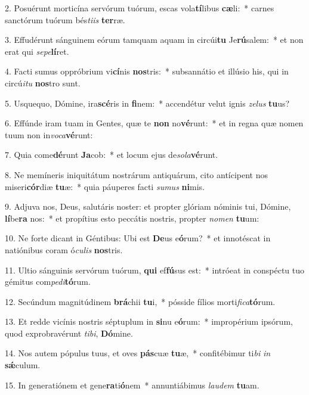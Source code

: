 2. Posuérunt morticína servórum tuórum, escas vola\textbf{tí}libus \textbf{cæ}li:~*  carnes sanctórum tuórum bés\textit{ti}\textit{is} \textbf{ter}ræ.\

3. Effudérunt sánguinem eórum tamquam aquam in circúi\textbf{tu} Je\textbf{rú}salem:~*  et non erat qui \textit{se}\textit{pe}\textbf{lí}ret.\

4. Facti sumus oppróbrium vi\textbf{cí}nis \textbf{nos}tris:~*  subsannátio et illúsio his, qui in circú\textit{i}\textit{tu} \textbf{nos}tro sunt.\

5. Usquequo, Dómine, ira\textbf{scé}ris in \textbf{fi}nem:~*  accendétur velut ignis \textit{ze}\textit{lus} \textbf{tu}us?\

6. Effúnde iram tuam in Gentes, quæ te \textbf{non} no\textbf{vé}runt:~*  et in regna quæ nomen tuum non in\textit{vo}\textit{ca}\textbf{vé}runt:\

7. Quia come\textbf{dé}runt \textbf{Ja}cob:~*  et locum ejus de\textit{so}\textit{la}\textbf{vé}runt.\

8. Ne memíneris iniquitátum nostrárum antiquárum, cito antícipent nos miseri\textbf{cór}diæ \textbf{tu}æ:~*  quia páuperes facti \textit{su}\textit{mus} \textbf{ni}mis.\

9. Adjuva nos, Deus, salutáris noster: et propter glóriam nóminis tui, Dómine, \textbf{lí}be\textbf{ra} nos:~*  et propítius esto peccátis nostris, propter \textit{no}\textit{men} \textbf{tu}um:\

10. Ne forte dicant in Géntibus: Ubi est \textbf{De}us e\textbf{ó}rum?~*  et innotéscat in natiónibus coram ó\textit{cu}\textit{lis} \textbf{nos}tris.\

11. Ultio sánguinis servórum tuórum, \textbf{qui} ef\textbf{fú}sus est:~*  intróeat in conspéctu tuo gémitus com\textit{pe}\textit{di}\textbf{tó}rum.\

12. Secúndum magnitúdinem \textbf{brá}chii \textbf{tu}i,~*  pósside fílios morti\textit{fi}\textit{ca}\textbf{tó}rum.\

13. Et redde vicínis nostris séptuplum in \textbf{si}nu e\textbf{ó}rum:~*  impropérium ipsórum, quod exprobravérunt \textit{ti}\textit{bi}, \textbf{Dó}mine.\

14. Nos autem pópulus tuus, et oves \textbf{pás}cuæ \textbf{tu}æ,~*  confitébimur ti\textit{bi} \textit{in} \textbf{sǽ}culum.\

15. In generatiónem et gene\textbf{ra}ti\textbf{ó}nem~*  annuntiábimus \textit{lau}\textit{dem} \textbf{tu}am.\


